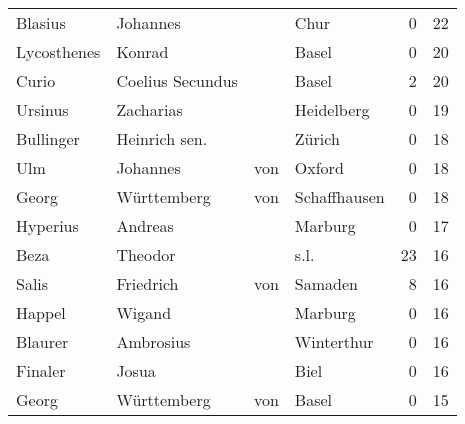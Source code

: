 \begin{tabular}{llllrr}
                  Blasius &                           Johannes &             &                                        Chur &          0 &        22 \\
              Lycosthenes &                             Konrad &             &                                       Basel &          0 &        20 \\
                    Curio &                   Coelius Secundus &             &                                       Basel &          2 &        20 \\
                  Ursinus &                          Zacharias &             &                                  Heidelberg &          0 &        19 \\
                Bullinger &                      Heinrich sen. &             &                                      Zürich &          0 &        18 \\
                      Ulm &                           Johannes &         von &                                      Oxford &          0 &        18 \\
                    Georg &                        Württemberg &         von &                                Schaffhausen &          0 &        18 \\
                 Hyperius &                            Andreas &             &                                     Marburg &          0 &        17 \\
                     Beza &                            Theodor &             &                                        s.l. &         23 &        16 \\
                    Salis &                          Friedrich &         von &                                     Samaden &          8 &        16 \\
                   Happel &                             Wigand &             &                                     Marburg &          0 &        16 \\
                  Blaurer &                          Ambrosius &             &                                  Winterthur &          0 &        16 \\
                  Finaler &                              Josua &             &                                        Biel &          0 &        16 \\
                    Georg &                        Württemberg &         von &                                       Basel &          0 &        15 \\

\end{tabular}
